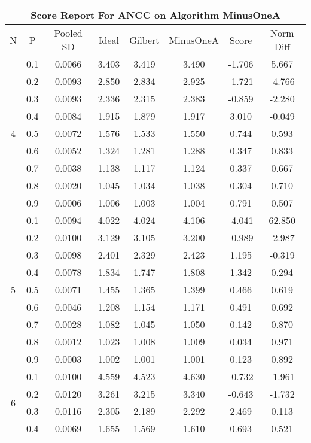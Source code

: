 \documentclass[11pt,a4paper]{report}
\begin{document}
\begin{longtable}{ | c | c || c | c | c | c | c | c | }
\hline
\multicolumn{8}{|c|}{ Score Report For ANCC on Algorithm MinusOneA} \\
\hline
N & P & Pooled SD &  Ideal &  Gilbert & MinusOneA  & Score & Norm Diff \\
 \hline
 \hline
 \endhead
\multirow{9}{*}{4} & 0.1 & 0.0066 & 3.403 & 3.419 & 3.490 & -1.706 & 5.667 \\
 & 0.2 & 0.0093 & 2.850 & 2.834 & 2.925 & -1.721 & -4.766 \\
 & 0.3 & 0.0093 & 2.336 & 2.315 & 2.383 & -0.859 & -2.280 \\
 & 0.4 & 0.0084 & 1.915 & 1.879 & 1.917 & 3.010 & -0.049 \\
 & 0.5 & 0.0072 & 1.576 & 1.533 & 1.550 & 0.744 & 0.593 \\
 & 0.6 & 0.0052 & 1.324 & 1.281 & 1.288 & 0.347 & 0.833 \\
 & 0.7 & 0.0038 & 1.138 & 1.117 & 1.124 & 0.337 & 0.667 \\
 & 0.8 & 0.0020 & 1.045 & 1.034 & 1.038 & 0.304 & 0.710 \\
 & 0.9 & 0.0006 & 1.006 & 1.003 & 1.004 & 0.791 & 0.507 \\
 \hline
\multirow{9}{*}{5} & 0.1 & 0.0094 & 4.022 & 4.024 & 4.106 & -4.041 & 62.850 \\
 & 0.2 & 0.0100 & 3.129 & 3.105 & 3.200 & -0.989 & -2.987 \\
 & 0.3 & 0.0098 & 2.401 & 2.329 & 2.423 & 1.195 & -0.319 \\
 & 0.4 & 0.0078 & 1.834 & 1.747 & 1.808 & 1.342 & 0.294 \\
 & 0.5 & 0.0071 & 1.455 & 1.365 & 1.399 & 0.466 & 0.619 \\
 & 0.6 & 0.0046 & 1.208 & 1.154 & 1.171 & 0.491 & 0.692 \\
 & 0.7 & 0.0028 & 1.082 & 1.045 & 1.050 & 0.142 & 0.870 \\
 & 0.8 & 0.0012 & 1.023 & 1.008 & 1.009 & 0.034 & 0.971 \\
 & 0.9 & 0.0003 & 1.002 & 1.001 & 1.001 & 0.123 & 0.892 \\
 \hline
\multirow{9}{*}{6} & 0.1 & 0.0100 & 4.559 & 4.523 & 4.630 & -0.732 & -1.961 \\
 & 0.2 & 0.0120 & 3.261 & 3.215 & 3.340 & -0.643 & -1.732 \\
 & 0.3 & 0.0116 & 2.305 & 2.189 & 2.292 & 2.469 & 0.113 \\
 & 0.4 & 0.0069 & 1.655 & 1.569 & 1.610 & 0.693 & 0.521 \\

\end{longtable}
\end{document}

